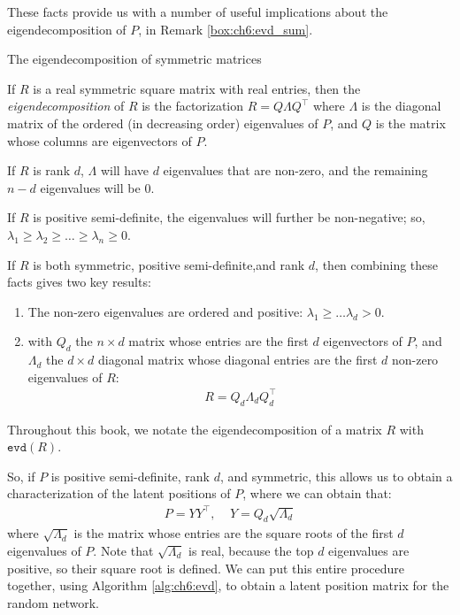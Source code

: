 These facts provide us with a number of useful implications about the eigendecomposition of $P$, in Remark \ref{box:ch6:evd_sum}.
\begin{floatingbox}[h]\caption{The eigendecomposition of symmetric matrices}
\label{box:ch6:evd_sum}
If $R$ is a real symmetric square matrix with real entries, then the \textit{eigendecomposition} of $R$ is the factorization $R = Q\Lambda Q^\top$ where $\Lambda$ is the diagonal matrix of the ordered (in decreasing order) eigenvalues of $P$, and $Q$ is the matrix whose columns are eigenvectors of $P$. 

If $R$ is rank $d$, $\Lambda$ will have $d$ eigenvalues that are non-zero, and the remaining $n - d$ eigenvalues will be $0$. 

If $R$ is positive semi-definite, the eigenvalues will further be non-negative; so, $\lambda_1 \geq \lambda_2 \geq \hdots \geq \lambda_ n \geq 0$.

If $R$ is both symmetric, positive semi-definite,and rank $d$, then combining these facts gives two key results:
\begin{enumerate}
    \item The non-zero eigenvalues are ordered and positive: $\lambda_1 \geq \hdots \lambda_d > 0$.
    \item with $Q_d$ the $n \times d$ matrix whose entries are the first $d$ eigenvectors of $P$, and $\Lambda_d$ the $d \times d$ diagonal matrix whose diagonal entries are the first $d$ non-zero eigenvalues of $R$:
\begin{align*}
R = Q_d \Lambda_d Q_d^\top
\end{align*}
\end{enumerate}
Throughout this book, we notate the eigendecomposition of a matrix $R$ with $\texttt{evd}(R)$.
\end{floatingbox}

So, if $P$ is positive semi-definite, rank $d$, and symmetric, this allows us to obtain a characterization of the latent positions of $P$, where we can obtain that:
\begin{align*}
    P = YY^\top,\;\;\;\; Y = Q_d \sqrt{\Lambda_d}
\end{align*}
where $\sqrt{\Lambda_d}$ is the matrix whose entries are the square roots of the first $d$ eigenvalues of $P$. Note that $\sqrt{\Lambda_d}$ is real, because the top $d$ eigenvalues are positive, so their square root is defined. We can put this entire procedure together, using Algorithm \ref{alg:ch6:evd}, to obtain a latent position matrix for the random network.

